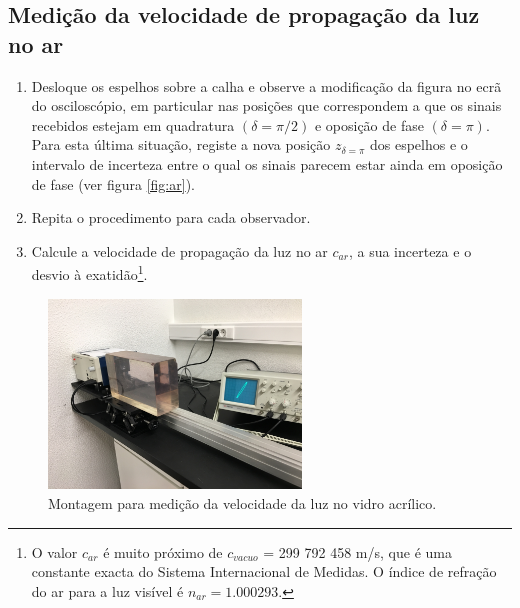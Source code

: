 \documentclass[12pt,a4paper,oneside]{paper}
\begin{document}
\subsection{\sf Medição da velocidade de propagação da luz no ar}
    \begin{enumerate}
    \item Desloque os espelhos sobre a calha e observe a modificação da figura no ecrã do 
    osciloscópio, em particular nas posições que correspondem a que os sinais recebidos estejam 
    em quadratura $(\delta=\pi/2)$ e oposição de fase $(\delta=\pi)$. Para esta última situação, registe a 
    nova posição $z_{\delta=\pi}$ dos espelhos e o intervalo de incerteza entre o qual os sinais parecem estar ainda em 
    oposição de fase (ver figura \ref{fig:ar}).
    \item Repita o procedimento para cada observador. 
    \item Calcule a velocidade de propagação da luz no ar $c_{ar}$, a sua incerteza e o desvio à exatidão\footnote{O valor $c_{ar}$
    é muito próximo de $c_{vacuo}$ = 299 792 458 m/s, que é uma constante exacta do Sistema Internacional de Medidas. O índice de
    refração do ar para a luz visível é $n_{ar}=1.000293$.}. 
    \end{enumerate}

    \begin{figure}[H]  
        \centering 
        \includegraphics[width=0.6\textwidth]{./luz_images/fig7.jpg}
        \caption{Montagem para medição da velocidade da luz no vidro acrílico. \label{fig:vidro}} 
    \end{figure}
\end{document}
